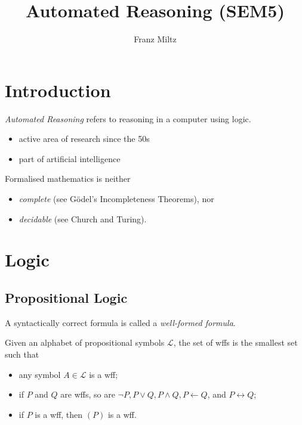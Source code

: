 \documentclass{article}
\title{Automated Reasoning (SEM5)}
\author{Franz Miltz}
\begin{document}
\maketitle
\tableofcontents
\pagebreak
\section{Introduction}
\begin{definition}
    \emph{Automated Reasoning} refers to reasoning in a computer using logic.
    \begin{itemize}
        \item active area of research since the 50s
        \item part of artificial intelligence
    \end{itemize}
\end{definition}
\begin{theorem}
    Formalised mathematics is neither
    \begin{itemize}
        \item \emph{complete} (see G\"odel's Incompleteness Theorems), nor
        \item \emph{decidable} (see Church and Turing).
    \end{itemize}
\end{theorem}

\section{Logic}
\subsection{Propositional Logic}

\begin{definition}
    A syntactically correct formula is called a \emph{well-formed formula}.

    Given an alphabet of propositional symbols $\mathcal{L}$, the
    set of wffs is the smallest set such that 
    \begin{itemize}
        \item any symbol $A\in\mathcal{L}$ is a wff;
        \item if $P$ and $Q$ are wffs, so are $\neg P, P\vee Q, P\wedge Q, P\leftarrow Q$, and $P\leftrightarrow Q$;
        \item if $P$ is a wff, then $(P)$ is a wff.
    \end{itemize}
\end{definition}
\end{document}
